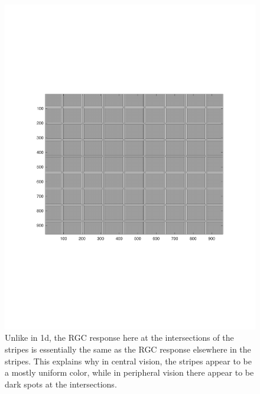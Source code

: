 \documentclass[]{article}
\begin{document}
\begin{figure}[H]
    \centering
    \includegraphics{problem1E.pdf}
    \caption{Unlike in 1d, the RGC response here at the intersections of the stripes is essentially the same as the RGC response elsewhere in the stripes. This explains why in central vision, the stripes appear to be a mostly uniform color, while in peripheral vision there appear to be dark spots at the intersections.}
    \label{fig:my_label}
\end{figure}
\end{document}
